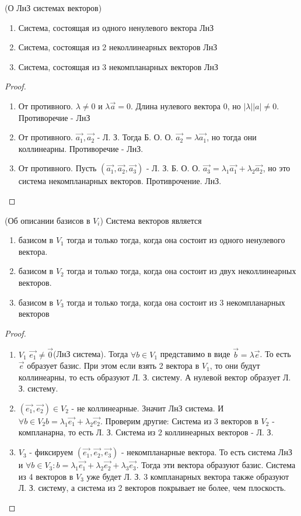 \begin{theorem}
	(О ЛнЗ системах векторов)
	\begin{enumerate}
		\item Система, состоящая из одного ненулевого вектора ЛнЗ
		\item Система, состоящая из 2 неколлинеарных векторов ЛнЗ
		\item Система, состоящая из 3 некомпланарных векторов ЛнЗ
	\end{enumerate}
\end{theorem}
\begin{proof}
	\begin{enumerate}
		\item От противного. $\lambda\ne 0$ и $\lambda\vec{a}=0$. Длина нулевого вектора 0, но
		$|\lambda||a|\ne0$. Противоречие - ЛнЗ
		\item От противного. $\vec{a_1}, \vec{a_2}$ - Л. З. Тогда Б. О. О. $\vec{a_2} = \lambda \vec{a_1}$, но тогда они коллинеарны. Противоречие - ЛнЗ.
		\item От противного. Пусть \((\vec{a_1}, \vec{a_2}, \vec{a_3})\) - Л. З. Б. О. О. $\vec{a_3} = \lambda_1\vec{a_1} + \lambda_2\vec{a_2}$, но это система некомпланарных векторов. Противрочение. ЛнЗ.
	\end{enumerate}
\end{proof}
\begin{theorem}
	(Об описании базисов в $V_i$) Система векторов является 
	\begin{enumerate}
		\item базисом в $V_1$ тогда и только тогда, когда она состоит из одного ненулевого вектора.
		\item базисом в $V_2$ тогда и только тогда, когда она состоит из двух неколлинеарных векторов.
		\item базисом в $V_3$ тогда и только тогда, когда она состоит из 3 некомпланарных векторов
	\end{enumerate}
\end{theorem}
\begin{proof}
	\begin{enumerate}
		\item \(V_1\) $\vec{e_1}\ne\vec{0}$(ЛнЗ система). Тогда $\forall b \in V_1$ представимо в виде $\vec{b} = \lambda \vec{e}$. То есть $\vec{e}$ образует базис. При этом если взять 2 вектора в $V_1$, то они будут коллинеарны, то есть образуют Л. З. систему. А нулевой вектор образует Л. З. систему.
		\item $(\vec{e_1}, \vec{e_2}) \in V_2$ - не коллинеарные. Значит ЛнЗ система. И $\forall b\in V_2 b = \lambda_1\vec{e_1}+\lambda_2\vec{e_2}$. Проверим другие: Система из 3 векторов в $V_2$ - компланарна, то есть Л. З. Система из 2 коллинеарных векторов - Л. З.
		\item $V_3$ - фиксируем \((\vec{e_1}, \vec{e_2}, \vec{e_3})\) - некомпланарные вектора. То есть система ЛнЗ и $\forall b \in V_3: b = \lambda_1\vec{e_1}+\lambda_2\vec{e_2}+\lambda_3\vec{e_3}$. Тогда эти вектора образуют базис. Система из 4 векторов в $V_3$ уже будет Л. З. 3 компланарных вектора также образуют Л. З. систему, а система из 2 векторов покрывает не более, чем плоскость.
	\end{enumerate}
\end{proof}
